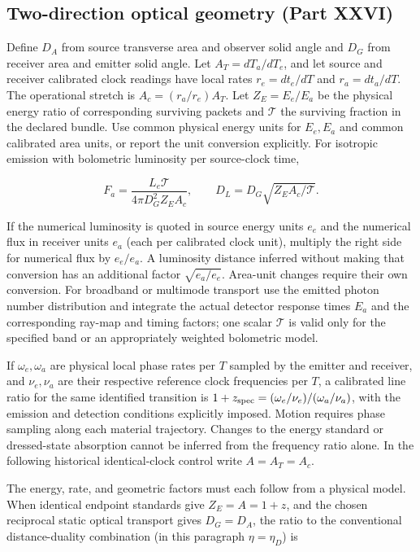 \documentclass[
  11pt,
  twoside]{article}
\begin{document}
\subsection{Two-direction optical geometry (Part
XXVI)}\label{two-direction-optical-geometry-part-xxvi}

Define \(D_A\) from source transverse area and observer solid angle and
\(D_G\) from receiver area and emitter solid angle. Let
\(A_T=dT_a/dT_e\), and let source and receiver calibrated clock readings
have local rates \(r_e=dt_e/dT\) and \(r_a=dt_a/dT\). The operational
stretch is \(A_c=(r_a/r_e)A_T\). Let \(Z_E=E_e/E_a\) be the physical
energy ratio of corresponding surviving packets and \(\mathcal T\) the
surviving fraction in the declared bundle. Use common physical energy
units for \(E_e,E_a\) and common calibrated area units, or report the
unit conversion explicitly. For isotropic emission with bolometric
luminosity per source-clock time,

\[F_a=\frac{L_e\mathcal T}{4\pi D_G^2 Z_E A_c},\qquad D_L=D_G\sqrt{Z_E A_c/\mathcal T}.\tag{O1}\]

If the numerical luminosity is quoted in source energy units \(e_e\) and
the numerical flux in receiver units \(e_a\) (each per calibrated clock
unit), multiply the right side for numerical flux by \(e_e/e_a\). A
luminosity distance inferred without making that conversion has an
additional factor \(\sqrt{e_a/e_e}\). Area-unit changes require their
own conversion. For broadband or multimode transport use the emitted
photon number distribution and integrate the actual detector response
times \(E_a\) and the corresponding ray-map and timing factors; one
scalar \(\mathcal T\) is valid only for the specified band or an
appropriately weighted bolometric model.

If \(\omega_e,\omega_a\) are physical local phase rates per \(T\)
sampled by the emitter and receiver, and \(\nu_e,\nu_a\) are their
respective reference clock frequencies per \(T\), a calibrated line
ratio for the same identified transition is
\(1+z_{\rm spec}=(\omega_e/\nu_e)/(\omega_a/\nu_a)\), with the emission
and detection conditions explicitly imposed. Motion requires phase
sampling along each material trajectory. Changes to the energy standard
or dressed-state absorption cannot be inferred from the frequency ratio
alone. In the following historical identical-clock control write
\(A=A_T=A_c\).

The energy, rate, and geometric factors must each follow from a physical
model. When identical endpoint standards give \(Z_E=A=1+z\), and the
chosen reciprocal static optical transport gives \(D_G=D_A\), the ratio
to the conventional distance-duality combination (in this paragraph
\(η=η_D\)) is
\end{document}
